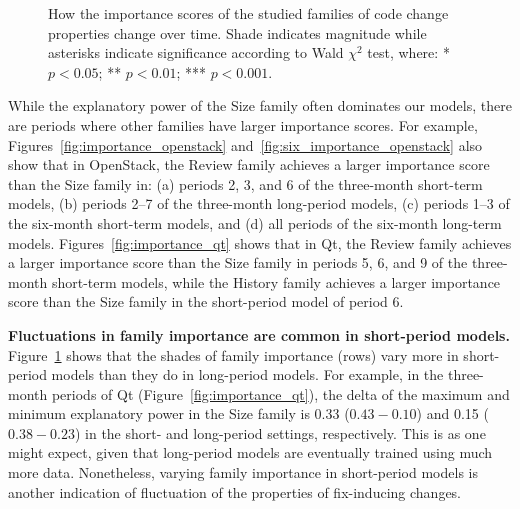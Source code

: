\begin{figure}[t]
  \centering
  \qquad
  \caption{How the importance scores of the studied families of code change properties change over time. Shade indicates magnitude while asterisks indicate significance according to Wald $\chi^2$ test, where: * $p < 0.05$; ** $p < 0.01$; *** $p < 0.001$.}
  \label{fig:importance}
\end{figure}

While the explanatory power of the Size family often dominates our models, there are periods where other families have larger importance scores.
For example, Figures~\ref{fig:importance_openstack} and~\ref{fig:six_importance_openstack} also show that in {\sc OpenStack}, the Review family achieves a larger importance score than the Size family in:
(a) periods 2, 3, and 6 of the three-month short-term models,
(b) periods 2--7 of the three-month long-period models,
(c) periods 1--3 of the six-month short-term models,
and (d) all periods of the six-month long-term models.
Figures~\ref{fig:importance_qt} shows that in {\sc Qt}, the Review family achieves a larger importance score than the Size family in periods 5, 6, and 9 of the three-month short-term models, while the History family achieves a larger importance score than the Size family in the short-period model of period 6.

\textbf{Fluctuations in family importance are common in short-period models.}
Figure~\ref{fig:importance} shows that the shades of family importance (rows) vary more in short-period models than they do in long-period models.
For example, in the three-month periods of {\sc Qt} (Figure~\ref{fig:importance_qt}), the delta of the maximum and minimum explanatory power in the Size family is 0.33 ($0.43 - 0.10$) and 0.15 ($0.38 - 0.23$) in the short- and long-period settings, respectively.
This is as one might expect, given that long-period models are eventually trained using much more data.
Nonetheless, varying family importance in short-period models is another indication of fluctuation of the properties of fix-inducing changes.

